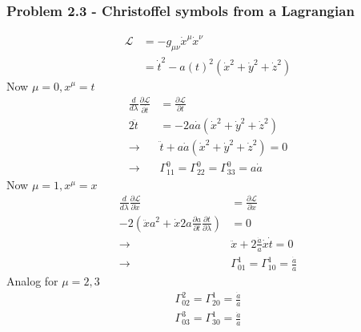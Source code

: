 \documentclass[10pt,a4paper]{article}
\theoremstyle{definition}
\begin{document}
\subsubsection{Problem 2.3 - Christoffel symbols from a Lagrangian}
\begin{align}
\mathcal{L}&=-g_{\mu\nu}\dot{x}^\mu\dot{x}^\nu\\
&=\dot{t}^2-a(t)^2(\dot{x}^2+\dot{y}^2+\dot{z}^2)
\end{align}
Now $\mu=0, x^\mu=t$
\begin{align}
\frac{d}{d\lambda}\frac{\partial\mathcal{L}}{\partial \dot{t}}&=\frac{\partial\mathcal{L}}{\partial t}\\
2\ddot{t}&=-2a\dot{a}(\dot{x}^2+\dot{y}^2+\dot{z}^2)\\
\rightarrow&\ddot{t}+a\dot{a}(\dot{x}^2+\dot{y}^2+\dot{z}^2)=0\\
\rightarrow&\Gamma^0_{11}=\Gamma^0_{22}=\Gamma^0_{33}=a\dot{a}
\end{align}
Now $\mu=1, x^\mu=x$
\begin{align}
\frac{d}{d\lambda}\frac{\partial\mathcal{L}}{\partial \dot{x}}&=\frac{\partial\mathcal{L}}{\partial x}\\
-2\left(\ddot{x}a^2+\dot{x}2a\frac{\partial a}{\partial t}\frac{\partial t}{\partial\lambda}\right)&=0\\
\rightarrow&\ddot{x}+2\frac{\dot{a}}{a}\dot{x}\dot{t}=0\\
\rightarrow&\Gamma^1_{01}=\Gamma^1_{10}=\frac{\dot{a}}{a}
\end{align}
Analog for $\mu=2,3$
\begin{align}
\Gamma^2_{02}=\Gamma^1_{20}=\frac{\dot{a}}{a}\\
\Gamma^3_{03}=\Gamma^1_{30}=\frac{\dot{a}}{a}
\end{align}
\end{document}

